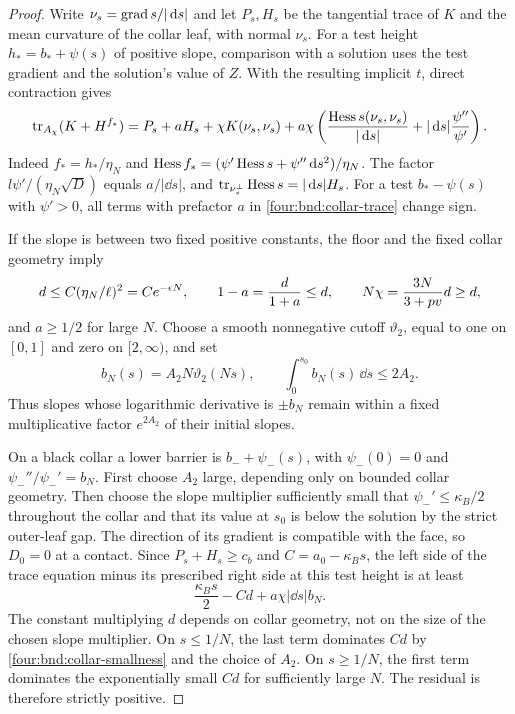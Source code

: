 \begin{proof}
Write $\nu_s=\operatorname{grad} s/|\,\mathrm d s|$ and let $P_s,H_s$ be the tangential trace
of $K$ and the mean curvature of the collar leaf, with normal $\nu_s$.
For a test height $h_*=b_*+\psi(s)$ of positive slope, comparison
with a solution uses the test gradient and the solution's value of
$Z$.  With the resulting implicit $t$, direct contraction gives
\begin{equation}\label{four:bnd:collar-trace}
 \operatorname{tr}_{A_\chi}(K+H^{f_*})
 =P_s+aH_s+\chi K(\nu_s,\nu_s)
 +a\chi\left(
 \frac{\operatorname{Hess} s(\nu_s,\nu_s)}{|\,\mathrm d s|}
       +|\,\mathrm d s|\frac{\psi''}{\psi'}\right).
\end{equation}
Indeed $f_*=h_*/\eta_N$ and
$\operatorname{Hess} f_*=(\psi'\operatorname{Hess} s+\psi''\,\mathrm d s^2)/\eta_N$.
The factor $l\psi'/(\eta_N\sqrt D)$ equals $a/|\dd s|$,
and $\operatorname{tr}_{\nu_s^\perp}\operatorname{Hess} s=|\,\mathrm d s|H_s$.  For a test
$b_*-\psi(s)$ with $\psi'>0$, all terms with prefactor $a$ in
\eqref{four:bnd:collar-trace} change sign.

If the slope is between two fixed positive constants, the floor
and the fixed collar geometry imply
\begin{equation}\label{four:bnd:collar-smallness}
 d\le C(\eta_N/\ell)^2=C e^{-\epsilon N},\qquad
 1-a=\frac{d}{1+a}\le d,\qquad
 N\chi=\frac{3N}{3+pv}d\ge d,
\end{equation}
and $a\ge1/2$ for large $N$.
Choose a smooth nonnegative cutoff $\vartheta_2$, equal to one on
$[0,1]$ and zero on $[2,\infty)$, and set
\[
 b_N(s)=A_2N\vartheta_2(Ns),\qquad
 \int_0^{s_0}b_N(s)\,\dd s\le2A_2.
\]
Thus slopes whose logarithmic derivative is $\pm b_N$ remain within
a fixed multiplicative factor $e^{2A_2}$ of their initial slopes.

On a black collar a lower barrier is $b_-+\psi_-(s)$, with
$\psi_-(0)=0$ and $\psi_-''/\psi_-'=b_N$.
First choose $A_2$ large, depending only on bounded collar geometry.
Then choose the slope multiplier sufficiently small that
$\psi_-'\le\kappa_B/2$ throughout the collar and that its value at
$s_0$ is below the solution by the strict outer-leaf gap.
The direction of its gradient is compatible with the face, so
$D_0=0$ at a contact.  Since $P_s+H_s\ge c_b$ and
$C=a_0-\kappa_Bs$, the left side of the trace equation minus its
prescribed right side at this test height is at least
\begin{equation}\label{four:bnd:lower-residual}
 \frac{\kappa_Bs}{2}-Cd+a\chi|\dd s|b_N.
\end{equation}
The constant multiplying $d$ depends on collar geometry, not on
the size of the chosen slope multiplier.  On $s\le1/N$, the last
term dominates $Cd$ by \eqref{four:bnd:collar-smallness} and the choice
of $A_2$.  On $s\ge1/N$, the first term dominates the exponentially
small $Cd$ for sufficiently large $N$.  The residual is therefore
strictly positive.


\end{proof}
